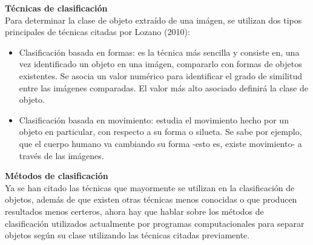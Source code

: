\documentclass[a4paper,12pt,oneside,spanish]{book}
\begin{document}
\begin{enumerate}[label=\alph*)]
		\textbf{Técnicas de clasificación}\\
		Para determinar la clase de objeto extraído de una imágen, se utilizan dos tipos principales de técnicas citadas por Lozano (2010):
		\begin{itemize}
			\setlength\itemsep{-1.2em}
			\item Clasificación basada en formas: es la técnica más sencilla y consiste en, una vez identificado un objeto en una imágen, compararlo con formas de objetos existentes. Se asocia un valor numérico para identificar el grado de similitud entre las imágenes comparadas. El valor más alto asociado definirá la clase de objeto.\\
			\item Clasificación basada en movimiento: estudia el movimiento hecho por un objeto en particular, con respecto a su forma o silueta. Se sabe por ejemplo, que el cuerpo humano va cambiando su forma -esto es, existe movimiento- a través de las imágenes. 
		\end{itemize}
		
		\textbf{Métodos de clasificación}\\
		Ya se han citado las técnicas que mayormente se utilizan en la clasificación de objetos, además de que existen otras técnicas menos conocidas o que producen resultados menos certeros, ahora hay que hablar sobre los métodos de clasificación utilizados actualmente por programas computacionales para separar objetos según su clase utilizando las técnicas citadas previamente.\par
		

\end{enumerate}
\end{document}
